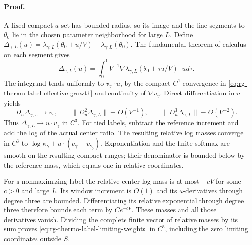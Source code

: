\paragraph{Proof.}
A fixed compact $u$-set has bounded radius, so its image and the line
segments to $\theta_0$ lie in the chosen parameter neighborhood for
large $L$. Define
$\Delta_{\gamma,L}(u)=\lambda_{\gamma,L}(\theta_0+u/V)
-\lambda_{\gamma,L}(\theta_0)$. The fundamental theorem of calculus
on each segment gives
\begin{equation}
 \Delta_{\gamma,L}(u)
 =\int_0^1 V^{-1}\nabla\lambda_{\gamma,L}(\theta_0+\tau u/V)
                                  \cdot u d\tau.
 \label{eq:rg-thermo-label-window-increment}
\end{equation}
The integrand tends uniformly to $v_\gamma\cdot u$, by the compact
$C^1$ convergence in \cref{eq:rg-thermo-label-effective-growth} and
continuity of $\nabla s_\gamma$. Direct differentiation in $u$ yields
\begin{equation}
 D_u\Delta_{\gamma,L}\to v_\gamma,\qquad
 \|D_u^2\Delta_{\gamma,L}\|=O(V^{-1}),\qquad
 \|D_u^3\Delta_{\gamma,L}\|=O(V^{-2}).
 \label{eq:rg-thermo-label-window-derivatives}
\end{equation}
Thus $\Delta_{\gamma,L}\to u\cdot v_\gamma$ in $C^3$. For tied labels,
subtract the reference increment and add the log of the actual center
ratio. The resulting relative log masses converge in $C^3$ to
$\log\kappa_\gamma+u\cdot(v_\gamma-v_{\gamma_0})$.
Exponentiation and the finite softmax are smooth on the resulting
compact ranges; their denominator is bounded below by the reference
mass, which equals one in relative coordinates.

For a nonmaximizing label the relative center log mass is at most
$-cV$ for some $c>0$ and large $L$. Its window increment is $O(1)$
and its $u$-derivatives through degree three are bounded. Differentiating
its relative exponential through degree three therefore bounds each
term by $Ce^{-cV}$. These masses and all those derivatives vanish.
Dividing the complete finite vector of relative masses by its sum
proves \cref{eq:rg-thermo-label-limiting-weights} in $C^3$, including
the zero limiting coordinates outside $S$.

